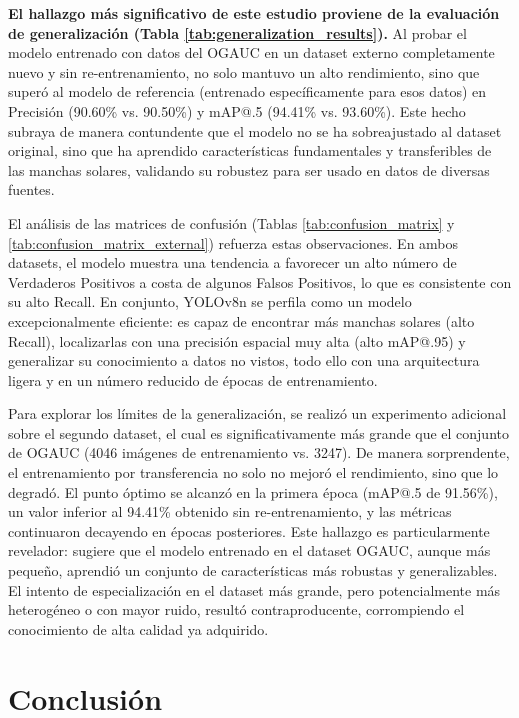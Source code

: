 \documentclass[journal]{IEEEtran}
\begin{document}
\textbf{El hallazgo más significativo de este estudio proviene de la evaluación de generalización (Tabla \ref{tab:generalization_results}).} Al probar el modelo entrenado con datos del OGAUC en un dataset externo completamente nuevo y sin re-entrenamiento, no solo mantuvo un alto rendimiento, sino que superó al modelo de referencia (entrenado específicamente para esos datos) en Precisión (90.60\% vs. 90.50\%) y mAP@.5 (94.41\% vs. 93.60\%). Este hecho subraya de manera contundente que el modelo no se ha sobreajustado al dataset original, sino que ha aprendido características fundamentales y transferibles de las manchas solares, validando su robustez para ser usado en datos de diversas fuentes.

El análisis de las matrices de confusión (Tablas \ref{tab:confusion_matrix} y \ref{tab:confusion_matrix_external}) refuerza estas observaciones. En ambos datasets, el modelo muestra una tendencia a favorecer un alto número de Verdaderos Positivos a costa de algunos Falsos Positivos, lo que es consistente con su alto Recall. En conjunto, YOLOv8n se perfila como un modelo excepcionalmente eficiente: es capaz de encontrar más manchas solares (alto Recall), localizarlas con una precisión espacial muy alta (alto mAP@.95) y generalizar su conocimiento a datos no vistos, todo ello con una arquitectura ligera y en un número reducido de épocas de entrenamiento.

Para explorar los límites de la generalización, se realizó un experimento adicional sobre el segundo dataset, el cual es significativamente más grande que el conjunto de OGAUC (4046 imágenes de entrenamiento vs. 3247). De manera sorprendente, el entrenamiento por transferencia no solo no mejoró el rendimiento, sino que lo degradó. El punto óptimo se alcanzó en la primera época (mAP@.5 de 91.56\%), un valor inferior al 94.41\% obtenido sin re-entrenamiento, y las métricas continuaron decayendo en épocas posteriores. Este hallazgo es particularmente revelador: sugiere que el modelo entrenado en el dataset OGAUC, aunque más pequeño, aprendió un conjunto de características más robustas y generalizables. El intento de especialización en el dataset más grande, pero potencialmente más heterogéneo o con mayor ruido, resultó contraproducente, corrompiendo el conocimiento de alta calidad ya adquirido.

\section{Conclusión}
\end{document}

